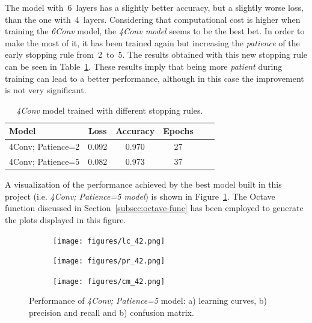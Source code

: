 The model with~6~layers has a slightly better accuracy, but a slightly worse loss, than the one with~4~layers. Considering that computational cost is higher when training the \textit{6Conv} model, the \emph{\textit{4Conv} model} seems to be the best bet. In order to make the most of it, it has been trained again but increasing the \emph{\textit{patience}} of the early stopping rule from~2~to~5. The results obtained with this new stopping rule can be seen in Table~\ref{tbl:arch_patience5}. These results imply that being more \textit{patient} during training can lead to a better performance, although in this case the improvement is not very significant.
\begin{table}
	\centering
	\begin{tabular}{l*{4}{c}r}
		\textbf{Model} & \textbf{Loss} & \textbf{Accuracy} & \textbf{Epochs} \\
		\hline
		4Conv; Patience=2 & 0.092 & 0.970 & 27 \\
		4Conv; Patience=5 & 0.082 & 0.973 & 37 \\
	\end{tabular}
	\caption{\textit{4Conv} model trained with different stopping rules.}
	\label{tbl:arch_patience5}
\end{table}

A visualization of the performance achieved by the best model built in this project (i.e. \emph{4Conv; Patience=5 model}) is shown in Figure~\ref{fig:best}. The Octave function discussed in Section~\ref{subsec:octave-func} has been employed to generate the plots displayed in this figure.

\begin{figure}
	\centering
	\begin{subfigure}{1\textwidth}
		\centering
		\texttt{[image: figures/lc\_42.png]}
		\caption{}
	\end{subfigure}
	\begin{subfigure}{0.5\textwidth}
		\centering
		\texttt{[image: figures/pr\_42.png]}
		\caption{}
	\end{subfigure}%
	\begin{subfigure}{0.5\textwidth}
		\centering
		\texttt{[image: figures/cm\_42.png]}
		\caption{}
	\end{subfigure}
	\caption{Performance of \textit{4Conv; Patience=5} model: a) learning curves, b) precision and recall and b) confusion matrix.}
	\label{fig:best}
\end{figure}